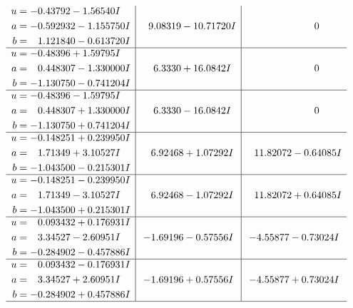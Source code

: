\documentclass[1p]{elsarticle_modified}
\theoremstyle{definition}
\begin{document}
$$\begin{array}{c|c|c}
\begin{aligned}
u &= -0.43792 - 1.56540 I \\
a &= -0.592932 - 1.155750 I \\
b &= \phantom{-}1.121840 - 0.613720 I\end{aligned}
 & \phantom{-}9.08319 - 10.71720 I & \phantom{-0.000000 } 0 \\ \hline\begin{aligned}
u &= -0.48396 + 1.59795 I \\
a &= \phantom{-}0.448307 - 1.330000 I \\
b &= -1.130750 - 0.741204 I\end{aligned}
 & \phantom{-}6.3330 + 16.0842 I & \phantom{-0.000000 } 0 \\ \hline\begin{aligned}
u &= -0.48396 - 1.59795 I \\
a &= \phantom{-}0.448307 + 1.330000 I \\
b &= -1.130750 + 0.741204 I\end{aligned}
 & \phantom{-}6.3330 - 16.0842 I & \phantom{-0.000000 } 0 \\ \hline\begin{aligned}
u &= -0.148251 + 0.239950 I \\
a &= \phantom{-}1.71349 + 3.10527 I \\
b &= -1.043500 - 0.215301 I\end{aligned}
 & \phantom{-}6.92468 + 1.07292 I & \phantom{-}11.82072 - 0.64085 I \\ \hline\begin{aligned}
u &= -0.148251 - 0.239950 I \\
a &= \phantom{-}1.71349 - 3.10527 I \\
b &= -1.043500 + 0.215301 I\end{aligned}
 & \phantom{-}6.92468 - 1.07292 I & \phantom{-}11.82072 + 0.64085 I \\ \hline\begin{aligned}
u &= \phantom{-}0.093432 + 0.176931 I \\
a &= \phantom{-}3.34527 - 2.60951 I \\
b &= -0.284902 - 0.457886 I\end{aligned}
 & -1.69196 - 0.57556 I & -4.55877 - 0.73024 I \\ \hline\begin{aligned}
u &= \phantom{-}0.093432 - 0.176931 I \\
a &= \phantom{-}3.34527 + 2.60951 I \\
b &= -0.284902 + 0.457886 I\end{aligned}
 & -1.69196 + 0.57556 I & -4.55877 + 0.73024 I\\
 \hline 
 \end{array}$$\newpage\newpage\renewcommand{\arraystretch}{1}
\end{document}
